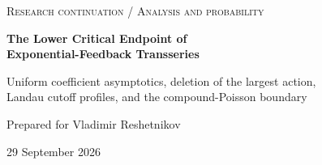 \documentclass[11pt,a4paper]{article}
\theoremstyle{definition}\newtheorem{definition}[theorem]{Definition}
\theoremstyle{remark}\newtheorem{remark}[theorem]{Remark}
\newcommand{\eps}{\varepsilon}
\newcommand{\Li}{\operatorname{Li}}
\newcommand{\1}{\mathbf 1}
\begin{document}
\hypersetup{pageanchor=false}
\begin{titlepage}
\vspace*{9mm}
\noindent\textsc{Research continuation \; / \; Analysis and probability}
\vspace{12mm}
\begin{center}
{\LARGE\bfseries The Lower Critical Endpoint of\\[5pt]
Exponential-Feedback Transseries}\par
\vspace{8mm}
{\large Uniform coefficient asymptotics, deletion of the largest action,\\[3pt]
Landau cutoff profiles, and the compound-Poisson boundary}\par
\vspace{11mm}
{Prepared for Vladimir Reshetnikov}\par
\vspace{3mm}
{29 September 2026}
\end{center}
\vspace{9mm}
\begin{abstract}
We study the lower endpoint of the critical power-law feedback equation
$U(q)=A_{\eps}(q e^{U(q)})$, where
$A_{\eps}(z)=(\Li_{2+\eps}(z)+P(z))/(\zeta(1+\eps)+P'(1))$,
$\eps>0$, and $P$ changes a fixed finite prefix while preserving
nonnegative coefficients. This is the $\alpha\downarrow1$ half of
Question~4 in the repository article \emph{Beyond Finite-Action Folds}.
Writing $\alpha=1+\eps$, $\beta=1/\alpha$,
$K_{\eps}=\Gamma(-\alpha)/(\zeta(\alpha)+P'(1))$,
$B=(nK_{\eps})^{\beta}$, and
$\rho_{\eps}=e^{-A_{\eps}(1)}$, we prove, uniformly down to arbitrarily
small positive $\eps$,
\[
 [q^n]U(q)\sim
 \frac{\rho_{\eps}^{-n}}{nB}\,
 \frac{\beta}{\Gamma(1-\beta)}.
\]
A branch-cut integral retains the vanishing factor $\eps$ in both the
main term and its error; it yields an explicit first correction and an
arbitrary fixed-order expansion. The critical inverse has a convergent
parameter-uniform Hahn chart, whose renormalized endpoint is a
dilogarithm with its logarithmic singularity.


\end{abstract}
\end{titlepage}
\end{document}
